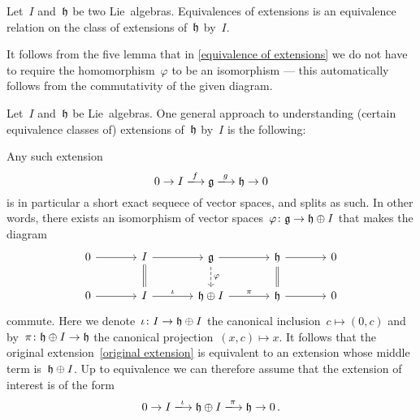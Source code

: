\begin{lemma}
  Let~$I$ and~$\mathfrak{h}$ be two Lie~algebras.
  Equivalences of extensions is an equivalence relation on the class of extensions of~$\mathfrak{h}$ by~$I$.
\end{lemma}


\begin{remark}
  It follows from the five lemma that in \cref{equivalence of extensions} we do not have to require the homomorphism~$\varphi$ to be an isomorphism --- this automatically follows from the commutativity of the given diagram.
\end{remark}


\begin{remark}
  \label{general approach to extensions}
  Let~$I$ and~$\mathfrak{h}$ be Lie~algebras.
  One general approach to understanding (certain equivalence classes of) extensions of~$\mathfrak{h}$ by~$I$ is the following:
  
  Any such extension
  \begin{equation}
  \label{original extension}
    0
    \to
    I
    \xlongto{f}
    \glie
    \xlongto{g}
    \hlie
    \to
    0
  \end{equation}
  is in particular a short exact sequece of vector spaces, and splits as such.
  In other words, there exists an isomorphism of vector spaces~$\varphi \colon \mathfrak{g} \to \mathfrak{h} \oplus I$ that makes the diagram
  \[
    \begin{tikzcd}[column sep = large]
      0
      \arrow{r}
      &
      I
      \arrow{r}
      \arrow[equal]{d}
      &
      \glie
      \arrow{r}
      \arrow[dashed]{d}[right]{\varphi}
      &
      \hlie
      \arrow{r}
      \arrow[equal]{d}
      &
      0
      \\
      0
      \arrow{r}
      &
      I
      \arrow{r}[above]{\iota}
      &
      \hlie \oplus I
      \arrow{r}[above]{\pi}
      &
      \hlie
      \arrow{r}
      &
      0
    \end{tikzcd}
  \]
  commute.
  Here we denote~$\iota \colon I \to \mathfrak{h} \oplus I$ the canonical inclusion~$c \mapsto (0,c)$ and by~$\pi \colon \mathfrak{h} \oplus I \to \mathfrak{h}$ the canonical projection~$(x,c) \mapsto x$.
  It follows that the original extension~\eqref{original extension} is equivalent to an extension whose middle term is~$\mathfrak{h} \oplus I$.
  Up to equivalence we can therefore assume that the extension of interest is of the form
  \[
    0
    \to
    I
    \xlongto{\iota}
    \hlie \oplus I
    \xlongto{\pi}
    \hlie
    \to
    0 \,.
  \]


\end{remark}
